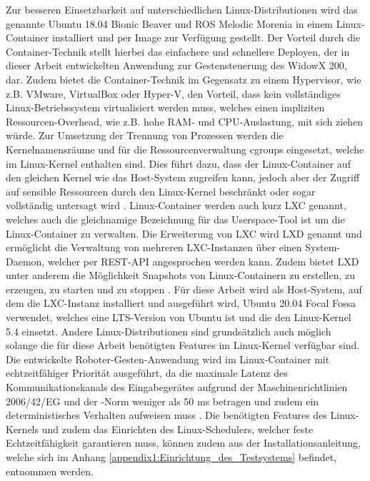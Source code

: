Zur besseren Einsetzbarkeit auf unterschiedlichen Linux-Distributionen wird das genannte Ubuntu 18.04 Bionic Beaver und ROS Melodic Morenia in einem Linux-Container installiert und per Image zur Verfügung gestellt. Der Vorteil durch die Container-Technik stellt hierbei das einfachere und schnellere Deployen, der in dieser Arbeit entwickelten Anwendung zur Gestensteuerung des WidowX 200, dar. Zudem bietet die Container-Technik im Gegensatz zu einem Hypervisor, wie z.B. VMware, VirtualBox oder Hyper-V, den Vorteil, dass kein vollständiges Linux-Betriebssystem virtualisiert werden muss, welches einen impliziten Ressourcen-Overhead, wie z.B. hohe RAM- und CPU-Auslastung, mit sich ziehen würde. Zur Umsetzung der Trennung von Prozessen werden die Kernelnamensräume und für die Ressourcenverwaltung cgroups eingesetzt, welche im Linux-Kernel enthalten sind. Dies führt dazu, dass der Linux-Container auf den gleichen Kernel wie das Host-System zugreifen kann, jedoch aber der Zugriff auf sensible Ressourcen durch den Linux-Kernel beschränkt oder sogar vollständig untersagt wird \cite{lxc_2020}. Linux-Container werden auch kurz LXC genannt, welches auch die gleichnamige Bezeichnung für das Userspace-Tool ist um die Linux-Container zu verwalten. Die Erweiterung von LXC wird LXD genannt und ermöglicht die Verwaltung von mehreren LXC-Instanzen über einen System-Daemon, welcher per REST-API angesprochen werden kann. Zudem bietet LXD unter anderem die Möglichkeit Snapshots von Linux-Containern zu erstellen, zu erzeugen, zu starten und zu stoppen \cite{lxc_2017}. Für diese Arbeit wird als Host-System, auf dem die LXC-Instanz installiert und ausgeführt wird, Ubuntu 20.04 Focal Fossa verwendet, welches eine LTS-Version von Ubuntu ist und die den Linux-Kernel 5.4 einsetzt. Andere Linux-Distributionen sind grundsätzlich auch möglich solange die für diese Arbeit benötigten Features im Linux-Kernel verfügbar sind. Die entwickelte Roboter-Gesten-Anwendung wird im Linux-Container mit echtzeitfähiger Priorität ausgeführt, da die maximale Latenz des Kommunikationskanals des Eingabegerätes aufgrund der Maschinenrichtlinien 2006/42/EG und der -Norm weniger als 50 ms betragen und zudem ein deterministisches Verhalten aufweisen muss \cite[55]{prassler_advances_2004}. Die benötigten Features des Linux-Kernels und zudem das Einrichten des Linux-Schedulers, welcher feste Echtzeitfähigkeit garantieren muss, können zudem aus der Installationsanleitung, welche sich im Anhang \ref{appendix1:Einrichtung_des_Testsystems} befindet, entnommen werden.

